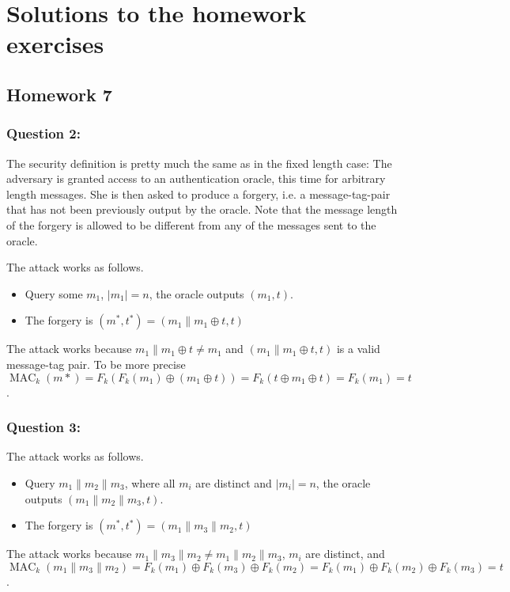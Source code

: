 \documentclass{article}
\numberwithin{defn}{section}
\numberwithin{equation}{section}
\newcommand{\MAC}{\operatorname{MAC}}
\begin{document}
\section*{Solutions to the homework exercises}

\subsection*{Homework 7}


	\subsubsection*{Question 2:} The security definition is pretty much the same as in the fixed length case: The adversary is granted access to an authentication oracle, this time for arbitrary length messages. She is then asked to produce a forgery, i.e. a message-tag-pair that has not been previously output by the oracle. Note that the message length of the forgery is allowed to be different from any of the messages sent to the oracle.
	
	The attack works as follows. 
\begin{itemize}
\item Query some $m_1$, $|m_1|=n$, the oracle outputs $( m_1,t )$.
\item The forgery is $(m^*,t^*)=( m_1\| m_1\oplus t,t )$
\end{itemize}	
The attack works because $m_1\| m_1\oplus t\neq m_1$ and $( m_1\| m_1\oplus t,t )$ is a valid message-tag pair. To be more precise $\MAC_k(m*)=F_k( F_k(m_1)\oplus (m_1\oplus t ))=F_k( t\oplus m_1\oplus t )=F_k(m_1)=t$.
	
	\subsubsection*{Question 3:}
The attack works as follows. 
\begin{itemize}
\item Query $m_1\|m_2\|m_3$, where all $m_i$ are distinct and $|m_i|=n$, the oracle outputs $(m_1\|m_2\|m_3,t )$.
\item The forgery is $(m^*,t^*)=( m_1\|m_3\|m_2,t )$
\end{itemize}	
The attack works because $m_1\|m_3\|m_2\neq m_1\|m_2\|m_3$, $m_i$ are distinct, and $\MAC_k(m_1\|m_3\|m_2)=F_k(m_1)\oplus F_k(m_3)\oplus F_k(m_2)=F_k(m_1)\oplus F_k(m_2)\oplus F_k(m_3) =t$.
\end{document}
